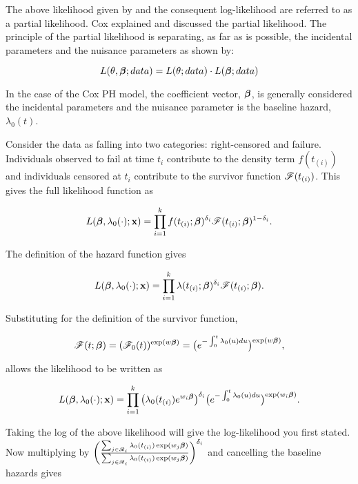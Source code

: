 The above likelihood given by  and the consequent log-likelihood are referred to as a partial likelihood. Cox  explained and discussed the partial likelihood. The principle of the partial likelihood is separating, as far as is possible, the incidental parameters and the nuisance parameters as shown by:

\begin{equation}
    L(\theta,\boldsymbol{\beta};data) = L(\theta;data)\cdot L(\boldsymbol{\beta};data)
\end{equation}

In the case of the Cox PH model, the coefficient vector, $\boldsymbol{\beta}$, is generally considered the incidental parameters and the nuisance parameter is the baseline hazard, $\lambda_0(t)$.

Consider the data as falling into two categories: right-censored and failure. Individuals observed to fail at time $t_i$ contribute to the density term $f(t_{(i)})$ and individuals censored at $t_i$ contribute to the survivor function $\mathscr{F}(t_{(i)})$. This gives the full likelihood function as

\begin{equation}
    L(\boldsymbol{\beta},\lambda_0(\cdot);\textbf{x})=\prod_{i=1}^kf(t_{(i)};\boldsymbol{\beta})^{\delta_i}\mathscr{F}(t_{(i)};\boldsymbol{\beta})^{1-\delta_i}.
\end{equation}

The definition of the hazard function  gives 

\begin{equation}
    L(\boldsymbol{\beta},\lambda_0(\cdot);\textbf{x})=\prod_{i=1}^k\lambda(t_{(i)};\boldsymbol{\beta})^{\delta_i}\mathscr{F}(t_{(i)};\boldsymbol{\beta}).    
\end{equation}

Substituting for the definition of the survivor function,

\begin{equation}
    \mathscr{F}(t;\boldsymbol{\beta})=(\mathscr{F}_0(t))^{\exp(w\boldsymbol{\beta})}=\big(e^{-\int_0^t\lambda_0(u)du}\big)^{\exp(w\boldsymbol{\beta})},
\end{equation}

allows the likelihood to be written as

\begin{equation}
    L(\boldsymbol{\beta},\lambda_0(\cdot);\textbf{x})=\prod_{i=1}^k\big(\lambda_0(t_{(i)})e^{w_i\boldsymbol{\beta}}\big)^{\delta_i}\big(e^{-\int_0^t\lambda_0(u)du}\big)^{\exp(w_i\boldsymbol{\beta})}.
\end{equation}

Taking the log of the above likelihood will give the log-likelihood you first stated. Now multiplying by $\bigg(\frac{\sum_{j\in\mathscr{R}_i}\lambda_0(t_{(i)})\exp({w_j\boldsymbol{\beta}})}{\sum_{j\in\mathscr{R}_i}\lambda_0(t_{(i)})\exp({w_j\boldsymbol{\beta}})}\bigg)^{\delta_i}$ and cancelling the baseline hazards gives

